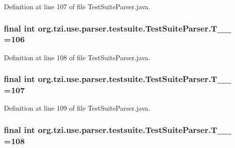 Definition at line 107 of file Test\-Suite\-Parser.\-java.

\hypertarget{classorg_1_1tzi_1_1use_1_1parser_1_1testsuite_1_1_test_suite_parser_ad17127fcb6a4fbc3c66772d525269c8f}{
\subsubsection[{T\-\_\-\-\_\-106}]{\setlength{\rightskip}{0pt plus 5cm}final int org.\-tzi.\-use.\-parser.\-testsuite.\-Test\-Suite\-Parser.\-T\-\_\-\-\_ =106\hspace{0.3cm}{\ttfamily [static]}}}\label{classorg_1_1tzi_1_1use_1_1parser_1_1testsuite_1_1_test_suite_parser_ad17127fcb6a4fbc3c66772d525269c8f}


Definition at line 108 of file Test\-Suite\-Parser.\-java.

\hypertarget{classorg_1_1tzi_1_1use_1_1parser_1_1testsuite_1_1_test_suite_parser_a13b14d68cfba5dbafb46781fb0fc9e82}{
\subsubsection[{T\-\_\-\-\_\-107}]{\setlength{\rightskip}{0pt plus 5cm}final int org.\-tzi.\-use.\-parser.\-testsuite.\-Test\-Suite\-Parser.\-T\-\_\-\-\_ =107\hspace{0.3cm}{\ttfamily [static]}}}\label{classorg_1_1tzi_1_1use_1_1parser_1_1testsuite_1_1_test_suite_parser_a13b14d68cfba5dbafb46781fb0fc9e82}


Definition at line 109 of file Test\-Suite\-Parser.\-java.

\hypertarget{classorg_1_1tzi_1_1use_1_1parser_1_1testsuite_1_1_test_suite_parser_aec09b4baea9c94561874a5b9268319ab}{
\subsubsection[{T\-\_\-\-\_\-108}]{\setlength{\rightskip}{0pt plus 5cm}final int org.\-tzi.\-use.\-parser.\-testsuite.\-Test\-Suite\-Parser.\-T\-\_\-\-\_ =108\hspace{0.3cm}{\ttfamily [static]}}}\label{classorg_1_1tzi_1_1use_1_1parser_1_1testsuite_1_1_test_suite_parser_aec09b4baea9c94561874a5b9268319ab}


